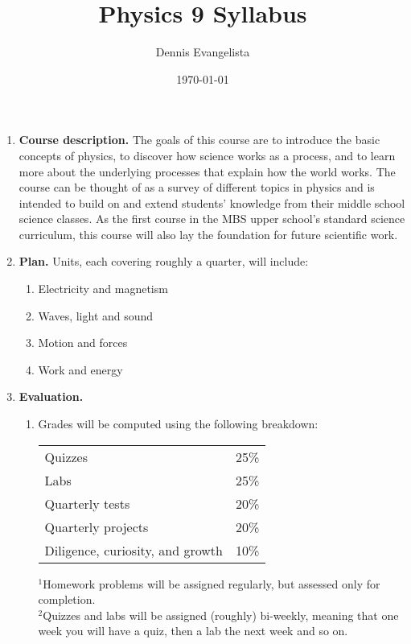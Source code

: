 \documentclass{article}
\title{Physics 9 Syllabus}
\author{Dennis Evangelista}
\date{\today}
\begin{document}

\begin{enumerate}
\item \textbf{Course description.} The goals of this course are to introduce the basic concepts of physics, to discover how science works as a process, and to learn more about the underlying processes that explain how the world works. The course can be thought of as a survey of different topics in physics and is intended to build on and extend students' knowledge from their middle school science classes. As the first course in the MBS upper school’s standard science curriculum, this course will also lay the foundation
for future scientific work.

\item \textbf{Plan.} Units, each covering roughly a quarter, will include:
\begin{enumerate}
\item Electricity and magnetism
\item Waves, light and sound
\item Motion and forces
\item Work and energy
\end{enumerate}

\item \textbf{Evaluation.} 
\begin{enumerate}
\item Grades will be computed using the following breakdown:
\begin{table}[h]
\begin{center}
\begin{tabular}{ll}
\toprule
Quizzes & 25\% \\
Labs & 25\% \\
Quarterly tests & 20\% \\
Quarterly projects & 20\% \\
Diligence, curiosity, and growth & 10\% \\
\bottomrule
\end{tabular}
\end{center}
{\scriptsize
$^1$Homework problems will be assigned regularly, but assessed only for completion.\\
$^2$Quizzes and labs will be assigned (roughly) bi-weekly, meaning that one week you will have a quiz, then a lab the next week and so on.}
\end{table}


\end{enumerate}
\end{enumerate}
\end{document}
